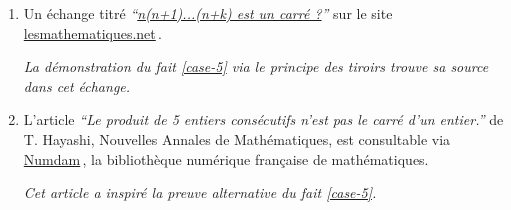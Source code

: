 

\begin{enumerate}
	\item Un échange titré \emph{\enquote{\href{https://les-mathematiques.net/vanilla/discussion/comment/351293}{n(n+1)...(n+k) est un carré ?}}} sur le site \url{lesmathematiques.net}\,.
	
	\smallskip
	\noindent
	\emph{La démonstration du fait \ref{case-5}  via le principe des tiroirs trouve sa source dans cet échange.}


	\item L'article \emph{\enquote{Le produit de 5 entiers consécutifs n'est pas le carré d'un entier.}} de T. Hayashi, Nouvelles Annales de Mathématiques, est consultable via \href{https://numdam.org}{Numdam}\,, la bibliothèque numérique française de mathématiques.
	
	\smallskip
	\noindent
	\emph{Cet article a inspiré la preuve alternative du fait \ref{case-5}.}
\end{enumerate}
